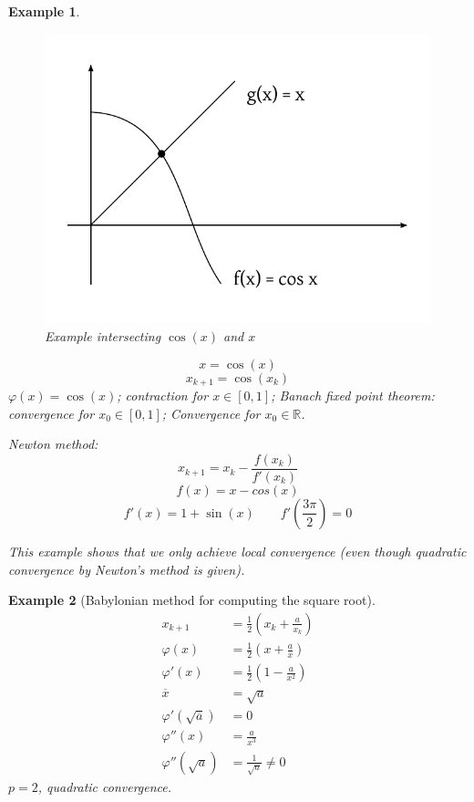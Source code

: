 \documentclass{article}
\newtheorem{example}{Example}
\begin{document}
\begin{example}
  \begin{figure}[t]
    \begin{center}
      \includegraphics[scale=0.6]{img/13_convergence_example.pdf}
      \caption{Example intersecting $\cos(x)$ and $x$}
      \label{img:intersect}
    \end{center}
  \end{figure}

  \[ x = \cos(x) \]
  \[ x_{k+1} = \cos(x_k) \]
  $\varphi(x) = \cos(x)$;
  contraction for $x \in [0,1]$;
  Banach fixed point theorem: convergence for $x_0 \in [0,1]$;
  Convergence for $x_0 \in \mathbb R$.

  Newton method:
  \[ x_{k+1} = x_k - \frac{f(x_k)}{f'(x_k)} \]
  \[ f(x) = x-cos(x) \]
  \[ f'(x) = 1 + \sin(x) \qquad f'\left(\frac{3\pi}{2}\right) = 0 \]

  This example shows that we only achieve local convergence (even though quadratic convergence by Newton's method is given).
\end{example}

\begin{example}[Babylonian method for computing the square root]
  \begin{align*}
    x_{k+1} &= \frac12 \left(x_k + \frac a{x_k}\right) \\
    \varphi(x) &= \frac12 \left(x + \frac ax\right) \\
    \varphi'(x) &= \frac12 \left(1 - \frac a{x^2}\right) \\
    \overline x &= \sqrt a \\
    \varphi'(\sqrt{\overline{a}}) &= 0 \\
    \varphi''(x) &= \frac a{x^3} \\
    \varphi''(\sqrt a) &= \frac{1}{\sqrt a} \neq 0
  \end{align*}
  $p=2$, quadratic convergence.
\end{example}
\end{document}
